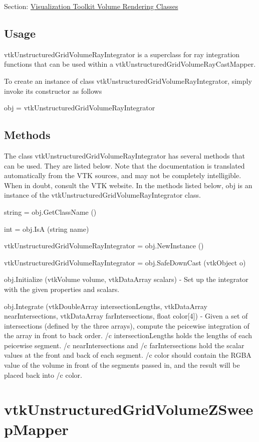 Section\-: \hyperlink{sec_vtkvolumerendering}{Visualization Toolkit Volume Rendering Classes} \hypertarget{vtkwidgets_vtkxyplotwidget_Usage}{}\subsection{Usage}\label{vtkwidgets_vtkxyplotwidget_Usage}
vtk\-Unstructured\-Grid\-Volume\-Ray\-Integrator is a superclass for ray integration functions that can be used within a vtk\-Unstructured\-Grid\-Volume\-Ray\-Cast\-Mapper.

To create an instance of class vtk\-Unstructured\-Grid\-Volume\-Ray\-Integrator, simply invoke its constructor as follows \begin{DoxyVerb}  obj = vtkUnstructuredGridVolumeRayIntegrator
\end{DoxyVerb}
 \hypertarget{vtkwidgets_vtkxyplotwidget_Methods}{}\subsection{Methods}\label{vtkwidgets_vtkxyplotwidget_Methods}
The class vtk\-Unstructured\-Grid\-Volume\-Ray\-Integrator has several methods that can be used. They are listed below. Note that the documentation is translated automatically from the V\-T\-K sources, and may not be completely intelligible. When in doubt, consult the V\-T\-K website. In the methods listed below, {\ttfamily obj} is an instance of the vtk\-Unstructured\-Grid\-Volume\-Ray\-Integrator class. 
\begin{DoxyItemize}
\item {\ttfamily string = obj.\-Get\-Class\-Name ()}  
\item {\ttfamily int = obj.\-Is\-A (string name)}  
\item {\ttfamily vtk\-Unstructured\-Grid\-Volume\-Ray\-Integrator = obj.\-New\-Instance ()}  
\item {\ttfamily vtk\-Unstructured\-Grid\-Volume\-Ray\-Integrator = obj.\-Safe\-Down\-Cast (vtk\-Object o)}  
\item {\ttfamily obj.\-Initialize (vtk\-Volume volume, vtk\-Data\-Array scalars)} -\/ Set up the integrator with the given properties and scalars.  
\item {\ttfamily obj.\-Integrate (vtk\-Double\-Array intersection\-Lengths, vtk\-Data\-Array near\-Intersections, vtk\-Data\-Array far\-Intersections, float color\mbox{[}4\mbox{]})} -\/ Given a set of intersections (defined by the three arrays), compute the peicewise integration of the array in front to back order. /c intersection\-Lengths holds the lengths of each peicewise segment. /c near\-Intersections and /c far\-Intersections hold the scalar values at the front and back of each segment. /c color should contain the R\-G\-B\-A value of the volume in front of the segments passed in, and the result will be placed back into /c color.  
\end{DoxyItemize}\hypertarget{vtkvolumerendering_vtkunstructuredgridvolumezsweepmapper}{}\section{vtk\-Unstructured\-Grid\-Volume\-Z\-Sweep\-Mapper}\label{vtkvolumerendering_vtkunstructuredgridvolumezsweepmapper}
